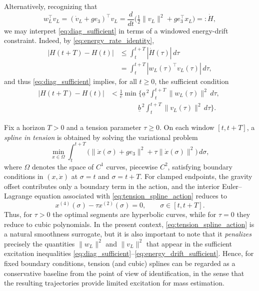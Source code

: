 \documentclass[letterpaper, 10 pt, conference]{ieeeconf}  %
\begin{document}
Alternatively, recognizing that
\begin{equation}\label{eq:energy_rate_identity}
w_L^\top v_L
=
(\dot v_L+ge_3)^\top v_L
=
\frac{d}{dt}\Big(\tfrac12\|v_L\|^2+ge_3^\top x_L\Big)
=:\dot H,
\end{equation}
we may interpret \eqref{eq:diag_sufficient} in terms of a windowed energy-drift constraint.
Indeed, by \eqref{eq:energy_rate_identity},
\begin{align*}
|H(t+T)-H(t)|&\le \int_t^{t+T}|\dot H(\tau)|\,d\tau \\
&= \int_t^{t+T}|w_L(\tau)^\top v_L(\tau)|\,d\tau,
\end{align*}
and thus \eqref{eq:diag_sufficient} implies, for all $t \ge 0$, the sufficient condition
\begin{equation}\label{eq:energy_drift_sufficient}
\begin{split}
    |H(t+T)-H(t)|
&<
\frac{1}{\overline c}\min\Bigg\{
\underline a^{\,2}\int_t^{t+T}\|w_L(\tau)\|^2\,d\tau,\; \\
&\qquad\qquad\underline b^{\,2}\int_t^{t+T}\|v_L(\tau)\|^2\,d\tau
\Bigg\}.
\end{split}
\end{equation}
 

Fix a horizon $T>0$ and a tension parameter $\tau\ge 0$.
On each window $[t,t+T]$, a \emph{spline in tension} is obtained by solving the variational problem
\begin{equation}\label{eq:tension_spline_action}
\min_{x\in\Omega}\int_t^{t+T}\Big(\|\ddot x(\sigma)+ge_3\|^2+\tau\|\dot x(\sigma)\|^2\Big)\,d\sigma,
\end{equation}
where $\Omega$ denotes the space of $C^1$ curves, piecewise $C^2$, satisfying boundary
conditions in $(x,\dot x)$ at $\sigma=t$ and $\sigma=t+T$.
For clamped endpoints, the gravity offset contributes only a boundary term in the action, and the interior Euler--Lagrange equation associated with \eqref{eq:tension_spline_action} reduces to 
\begin{equation}\label{eq:tension_spline_ode}
x^{(4)}(\sigma)- \tau x^{(2)}(\sigma)=0,\qquad \sigma\in[t,t+T].
\end{equation}
Thus, for $\tau>0$ the optimal segments are hyperbolic curves, while
for $\tau=0$ they reduce to cubic polynomials.
In the present context, \eqref{eq:tension_spline_action} is a natural smoothness surrogate, but it
is also important to note that it \emph{penalizes} precisely the quantities $\|w_L\|^2$ and
$\|v_L\|^2$ that appear in the sufficient excitation inequalities
\eqref{eq:diag_sufficient}--\eqref{eq:energy_drift_sufficient}. Hence, for fixed boundary
conditions, tension (and cubic) splines can be regarded as a conservative baseline from the point of view of identification, in the sense that the resulting trajectories provide limited excitation for mass estimation.
\end{document}
